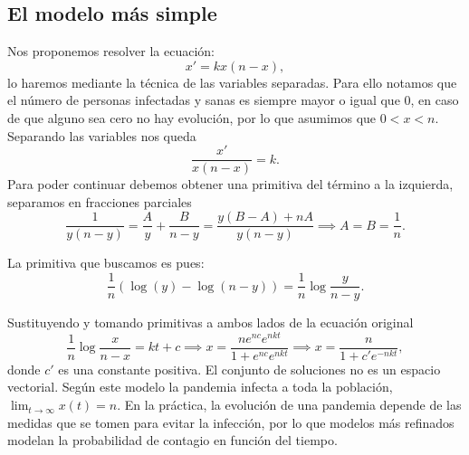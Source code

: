 \documentclass[../main.tex]{subfiles}
\begin{document}
\subsection{El modelo más simple}

Nos proponemos resolver la ecuación:
\[x' = k x(n - x),\]
lo haremos mediante la técnica de las variables separadas. Para ello notamos que
el número de personas infectadas y sanas es siempre mayor o igual que 0, en caso
de que alguno sea cero no hay evolución, por lo que asumimos que \(0 < x < n\).
Separando las variables nos queda
\[\frac{x'}{x(n - x)} = k.\]
Para poder continuar debemos obtener una primitiva del término a la izquierda,
separamos en fracciones parciales
\[\frac{1}{y(n - y)} = \frac{A}{y} + \frac{B}{n - y} 
	= \frac{y(B - A) + nA}{y(n - y)} \implies A = B = \frac{1}{n}.\]

La primitiva que buscamos es pues:
\[\frac{1}{n} (\log(y) - \log(n - y)) = \frac{1}{n} \log \frac{y}{n - y}.\]

Sustituyendo y tomando primitivas a ambos lados de la ecuación original
\[\frac{1}{n} \log\frac{x}{n - x} = kt + c 
	\implies x = \frac{n e^{nc} e^{nkt}}{1 + e^{nc} e^{nkt}}
	\implies x = \frac{n}{1 + c' e^{-nkt}},\]
donde \(c'\) es una constante positiva. El conjunto de soluciones no es un
espacio vectorial. Según este modelo la pandemia infecta a toda la población,
\(\lim_{t \to \infty} x(t) = n\). En la práctica, la evolución de una pandemia 
depende de las medidas que se tomen para evitar la infección, por lo que modelos
más refinados modelan la probabilidad de contagio en función del tiempo.
\end{document}
